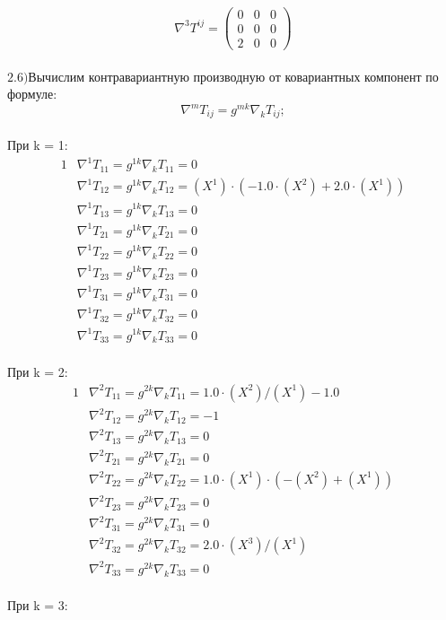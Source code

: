 \documentclass{article}
\begin{document}
\[
\nabla^3T^{ij} = \begin{pmatrix}
	0 & 0 & 0\\
	0 & 0 & 0\\
	2 & 0 & 0
\end{pmatrix}
\]\\
$\mathrm{2.6) }$Вычислим контравариантную производную от ковариантных компонент по формуле:\\
\[
\nabla^mT_{ij} = g^{mk}\nabla_kT_{ij};
\]\\
При k = 1:\\
\begin{alignat*}{1}
  & \nabla^1T_{11} = g^{1k}\nabla_kT_{11} = 0 \\
  & \nabla^1T_{12} = g^{1k}\nabla_kT_{12} = (X^1)\cdot (-1.0\cdot (X^2) + 2.0\cdot (X^1)) \\
  & \nabla^1T_{13} = g^{1k}\nabla_kT_{13} = 0 \\
  & \nabla^1T_{21} = g^{1k}\nabla_kT_{21} = 0 \\
  & \nabla^1T_{22} = g^{1k}\nabla_kT_{22} = 0 \\
  & \nabla^1T_{23} = g^{1k}\nabla_kT_{23} = 0 \\
  & \nabla^1T_{31} = g^{1k}\nabla_kT_{31} = 0 \\
  & \nabla^1T_{32} = g^{1k}\nabla_kT_{32} = 0 \\
  & \nabla^1T_{33} = g^{1k}\nabla_kT_{33} = 0 
\end{alignat*}\\
При k = 2:\\
\begin{alignat*}{1}
  & \nabla^2T_{11} = g^{2k}\nabla_kT_{11} = 1.0\cdot (X^2)/(X^1) - 1.0 \\
  & \nabla^2T_{12} = g^{2k}\nabla_kT_{12} = -1 \\
  & \nabla^2T_{13} = g^{2k}\nabla_kT_{13} = 0 \\
  & \nabla^2T_{21} = g^{2k}\nabla_kT_{21} = 0 \\
  & \nabla^2T_{22} = g^{2k}\nabla_kT_{22} = 1.0\cdot (X^1)\cdot (-(X^2) + (X^1)) \\
  & \nabla^2T_{23} = g^{2k}\nabla_kT_{23} = 0 \\
  & \nabla^2T_{31} = g^{2k}\nabla_kT_{31} = 0 \\
  & \nabla^2T_{32} = g^{2k}\nabla_kT_{32} = 2.0\cdot (X^3)/(X^1) \\
  & \nabla^2T_{33} = g^{2k}\nabla_kT_{33} = 0 
\end{alignat*}\\
При k = 3:\\
\end{document}
